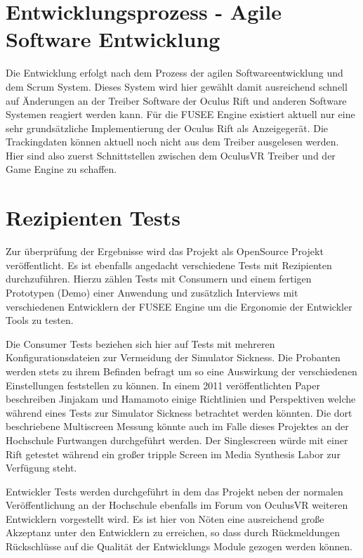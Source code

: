 \documentclass[pagesize, paper=a4, fontsize=12pt,titlepage=true, headings=small, headnosepline, abstractoff, liststotoc, nochapterprefix, plainheadsepline]{scrreprt}
\begin{document}
\section{Entwicklungsprozess - Agile Software Entwicklung}
Die Entwicklung erfolgt nach dem Prozess der agilen Softwareentwicklung und dem Scrum System. Dieses System wird hier gewählt damit ausreichend schnell auf Änderungen an der Treiber Software der Oculus Rift und anderen Software Systemen reagiert werden kann. Für die FUSEE Engine existiert aktuell nur eine sehr grundsätzliche Implementierung der Oculus Rift als Anzeigegerät. Die Trackingdaten können aktuell noch nicht aus dem Treiber ausgelesen werden. Hier sind also zuerst Schnittstellen zwischen dem OculusVR Treiber und der Game Engine zu schaffen. 

\section{Rezipienten Tests}
Zur überprüfung der Ergebnisse wird das Projekt als OpenSource Projekt veröffentlicht. Es ist ebenfalls angedacht verschiedene Tests mit Rezipienten durchzuführen. Hierzu zählen Tests mit Consumern und einem fertigen Prototypen (Demo) einer Anwendung und zusätzlich Interviews mit verschiedenen Entwicklern der FUSEE Engine um die Ergonomie der Entwickler Tools zu testen.

Die Consumer Tests beziehen sich hier auf Tests mit mehreren Konfigurationsdateien zur Vermeidung der Simulator Sickness. Die Probanten werden stets zu ihrem Befinden befragt um so eine Auswirkung der verschiedenen Einstellungen feststellen zu können. In einem 2011 veröffentlichten Paper beschreiben Jinjakam und Hamamoto \cite{JinjakamHamamoto2011} einige Richtlinien und Perspektiven welche während eines Tests zur Simulator Sickness betrachtet werden könnten. Die dort beschriebene Multiscreen Messung könnte auch im Falle dieses Projektes an der Hochschule Furtwangen durchgeführt werden. Der Singlescreen würde mit einer Rift getestet während ein großer tripple Screen im Media Synthesis Labor zur Verfügung steht.

Entwickler Tests werden durchgeführt in dem das Projekt neben der normalen Veröffentlichung an der Hochschule ebenfalls im Forum von OculusVR weiteren Entwicklern vorgestellt wird. Es ist hier von Nöten eine ausreichend große Akzeptanz unter den Entwicklern zu erreichen, so dass durch Rückmeldungen Rückschlüsse auf die Qualität der Entwicklungs Module gezogen werden können. 
\end{document}
